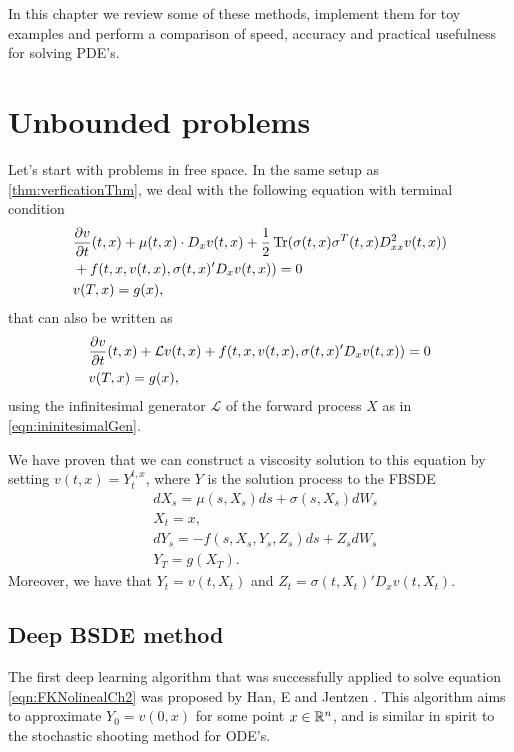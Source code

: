 In this chapter we review some of these methods, implement them for toy examples and perform a comparison of speed, accuracy and practical usefulness for solving PDE's.   

\section{Unbounded problems}
Let's start with problems in free space. In the same setup as \autoref{thm:verficationThm}, we deal with the following equation with terminal condition
\begin{equation}
	\label{eqn:FKNolinealCh2}
	\begin{split}
		&\frac{\partial v}{\partial t}(t,x)+\mu(t,x)\cdot D_x v(t,x)+\frac{1}{2}\operatorname{Tr}(\sigma(t,x)\sigma^{T}(t,x)D_{xx}^2v(t,x))\\
		&+f(t,x,v(t,x),\sigma(t,x)' D_x v(t,x))=0\\
		&v(T,x)=g(x),
	\end{split}
\end{equation}
that can also be written as 
\begin{equation}
	\label{eqn:FKNolinealLCh2}
	\begin{split}
	&\frac{\partial v}{\partial t}(t,x)+\mathcal{L} v(t,x)+f(t,x,v(t,x),\sigma(t,x)' D_x v(t,x))=0\\
	&v(T,x)=g(x),
   \end{split}
\end{equation}
using the infinitesimal generator $\mathcal{L}$ of the forward process $X$ as in \eqref{eqn:ininitesimalGen}.

We have proven that we can construct a viscosity solution to this equation by setting $v(t,x)=Y_{t}^{t,x}$, where $Y$ is the solution process to the FBSDE
\begin{equation}
	\label{eqn:UncoupledCh2}
	\begin{split}
		&dX_s=\mu(s,X_s)ds+\sigma(s,X_s)dW_s\\
		&X_t=x,\\
		&dY_s=-f(s,X_s,Y_s,Z_s)ds+Z_s dW_s\\
		&Y_T=g(X_T).
	\end{split}
\end{equation}
Moreover, we have that $Y_t=v(t,X_t)$ and $Z_t=\sigma(t,X_t)'D_x v(t,X_t)$.
\subsection{Deep BSDE method}
The first deep learning algorithm that was successfully applied to solve equation \eqref{eqn:FKNolinealCh2} was proposed by Han, E and Jentzen \cite{han_solving_2018,e_deep_2017}. This algorithm aims to approximate $Y_0=v(0,x)$ for some point $x\in \mathbb{R}^n$, and is similar in spirit to the stochastic shooting method for ODE's.

